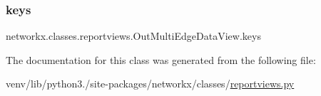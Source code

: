 \subsubsection{\texorpdfstring{keys}{keys}}
{\footnotesize\ttfamily networkx.\+classes.\+reportviews.\+Out\+Multi\+Edge\+Data\+View.\+keys}



The documentation for this class was generated from the following file\+:\begin{DoxyCompactItemize}
\item 
venv/lib/python3./site-\/packages/networkx/classes/\hyperlink{reportviews_8py}{reportviews.\+py}\end{DoxyCompactItemize}
